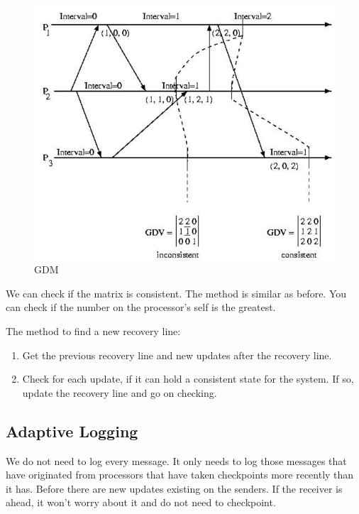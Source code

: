 \begin{figure}
\centering
\includegraphics[width=\textwidth]{img/ch03-log_gdv.png}
\caption{GDM}
\label{fig:ch03-log_gdv}
\end{figure}

We can check if the matrix is consistent. The method is similar as before. You can check if the number on the processor's self is the greatest.

The method to find a new recovery line:
\begin{enumerate}
    \item Get the previous recovery line and new updates after the recovery line.
    \item Check for each update, if it can hold a consistent state for the system. If so, update the recovery line and go on checking.
\end{enumerate}

\subsection{Adaptive Logging}
We do not need to log every message. It only needs to log those messages that have originated from processors that have taken checkpoints more recently than it has. Before there are new updates existing on the senders. If the receiver is ahead, it won't worry about it and do not need to checkpoint.
